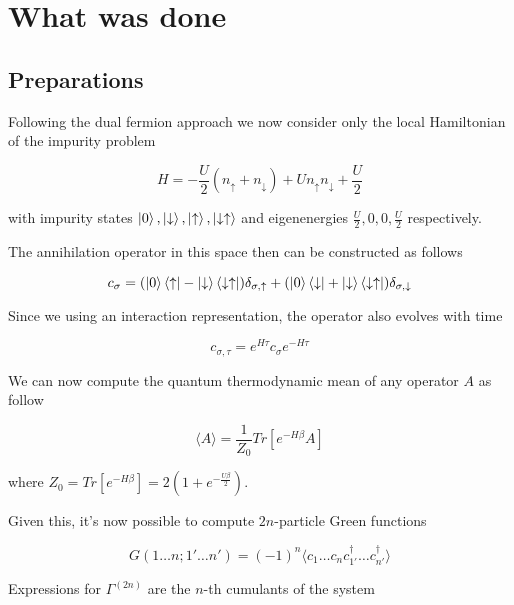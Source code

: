 \section{What was done}
\subsection{Preparations}
Following the dual fermion approach we now consider only the local Hamiltonian of the impurity problem

\begin{equation} H = -\frac{U}{2} \left(n_{\uparrow}+n_{\downarrow}\right) + U n_{\uparrow} n_{\downarrow} + \frac{U}{2} \end{equation}

with impurity states $\ket{0},\ket{\downarrow},\ket{\uparrow},\ket{\downarrow\uparrow}$ and eigenenergies $\frac{U}{2},0,0,\frac{U}{2}$ respectively.

The annihilation operator in this space then can be constructed as follows

\begin{equation} c_\sigma =  	(\ket{0}\bra{\uparrow}-\ket{\downarrow}\bra{\downarrow\uparrow})\delta_{\sigma,\uparrow}
	+	(\ket{0}\bra{\downarrow}+\ket{\downarrow}\bra{\downarrow\uparrow})\delta_{\sigma,\downarrow} \end{equation}

Since we using an interaction representation, the operator also evolves with time

\begin{equation} c_{\sigma,\tau} = e^{H\tau}c_\sigma e^{-H\tau} \end{equation}

We can now compute the quantum thermodynamic mean of any operator $A$ as follow

\begin{equation} \langle A\rangle = \frac{1}{Z_0}Tr[e^{-H\beta}A] \end{equation}

where $Z_0 = Tr[e^{-H\beta}] = 2(1+e^{-\frac{U\beta}{2}})$.

Given this, it's now possible to compute $2n$-particle Green functions

\begin{equation} G(1\dots n;1'\dots n') = (-1)^n \langle c_1\dots c_n c_{1'}^\dagger\dots c_{n'}^\dagger\rangle\end{equation}

Expressions for $\Gamma^{(2n)}$ are the $n$-th cumulants of the system

